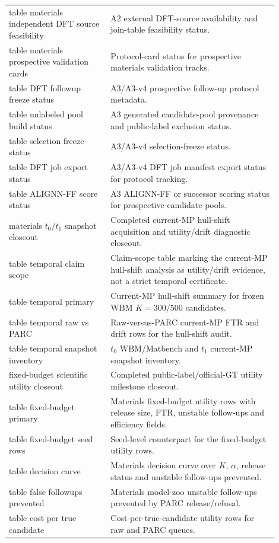 \documentclass[11pt]{article}
\begin{document}
\begin{longtable}{p{0.34\linewidth}p{0.56\linewidth}}
table materials independent DFT source feasibility & A2 external DFT-source availability and join-table feasibility status. \\
table materials prospective validation cards & Protocol-card status for prospective materials validation tracks. \\
table DFT followup freeze status & A3/A3-v4 prospective follow-up protocol metadata. \\
table unlabeled pool build status & A3 generated candidate-pool provenance and public-label exclusion status. \\
table selection freeze status & A3/A3-v4 selection-freeze status. \\
table DFT job export status & A3/A3-v4 DFT job manifest export status for protocol tracking. \\
table ALIGNN-FF score status & A3 ALIGNN-FF or successor scoring status for prospective candidate pools. \\
materials \(t_0/t_1\) snapshot closeout & Completed current-MP hull-shift acquisition and utility/drift diagnostic closeout. \\
table temporal claim scope & Claim-scope table marking the current-MP hull-shift analysis as utility/drift evidence, not a strict temporal certificate. \\
table temporal primary & Current-MP hull-shift summary for frozen WBM \(K=300/500\) candidates. \\
table temporal raw vs PARC & Raw-versus-PARC current-MP FTR and drift rows for the hull-shift audit. \\
table temporal snapshot inventory & \(t_0\) WBM/Matbench and \(t_1\) current-MP snapshot inventory. \\
fixed-budget scientific utility closeout & Completed public-label/official-GT utility milestone closeout. \\
table fixed-budget primary & Materials fixed-budget utility rows with release size, FTR, unstable follow-ups and efficiency fields. \\
table fixed-budget seed rows & Seed-level counterpart for the fixed-budget utility rows. \\
table decision curve & Materials decision curve over \(K\), \(\alpha\), release status and unstable follow-ups prevented. \\
table false followups prevented & Materials model-zoo unstable follow-ups prevented by PARC release/refusal. \\
table cost per true candidate & Cost-per-true-candidate utility rows for raw and PARC queues. \\

\end{longtable}
\end{document}
